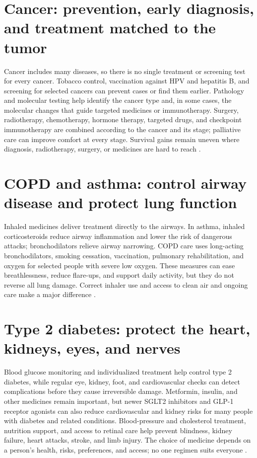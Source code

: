 \documentclass[12pt,oneside]{book}
\begin{document}
\section{Cancer: prevention, early diagnosis, and treatment matched to the tumor}
Cancer includes many diseases, so there is no single treatment or screening
test for every cancer. Tobacco control, vaccination against HPV and hepatitis
B, and screening for selected cancers can prevent cases or find them earlier.
Pathology and molecular testing help identify the cancer type and, in some
cases, the molecular changes that guide targeted medicines or immunotherapy.
Surgery, radiotherapy, chemotherapy, hormone therapy, targeted drugs, and
checkpoint immunotherapy are combined according to the cancer and its stage;
palliative care can improve comfort at every stage. Survival gains remain
uneven where diagnosis, radiotherapy, surgery, or medicines are hard to reach
\cite{whoCancer2026}.

\section{COPD and asthma: control airway disease and protect lung function}
Inhaled medicines deliver treatment directly to the airways. In asthma,
inhaled corticosteroids reduce airway inflammation and lower the risk of
dangerous attacks; bronchodilators relieve airway narrowing. COPD care uses
long-acting bronchodilators, smoking cessation, vaccination, pulmonary
rehabilitation, and oxygen for selected people with severe low oxygen. These
measures can ease breathlessness, reduce flare-ups, and support daily
activity, but they do not reverse all lung damage. Correct inhaler use and
access to clean air and ongoing care make a major difference
\cite{whoChronicRespiratory}.

\section{Type 2 diabetes: protect the heart, kidneys, eyes, and nerves}
Blood glucose monitoring and individualized treatment help control type 2
diabetes, while regular eye, kidney, foot, and cardiovascular checks can
detect complications before they cause irreversible damage. Metformin,
insulin, and other medicines remain important, but newer SGLT2 inhibitors and
GLP-1 receptor agonists can also reduce cardiovascular and kidney risks for
many people with diabetes and related conditions. Blood-pressure and
cholesterol treatment, nutrition support, and access to retinal care help
prevent blindness, kidney failure, heart attacks, stroke, and limb injury.
The choice of medicine depends on a person's health, risks, preferences, and
access; no one regimen suits everyone \cite{adaT2D2026}.
\end{document}
